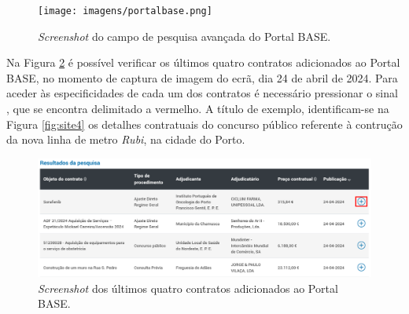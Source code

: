 \clearpage

\begin{figure}[H]
	\centering
	\texttt{[image: imagens/portalbase.png]}
	\caption{\textit{Screenshot} do campo de pesquisa avançada do Portal BASE.}
	\label{fig:site2}
\end{figure}

Na Figura \ref{fig:site3} é possível verificar os últimos quatro contratos adicionados ao Portal BASE, no momento de captura de imagem do ecrã, dia 24 de abril de 2024. Para aceder às especificidades de cada um dos contratos é necessário pressionar o sinal , que se encontra delimitado a vermelho. A título de exemplo, identificam-se na Figura \ref{fig:site4} os detalhes contratuais do concurso público referente à contrução da nova linha de metro \textit{Rubi}, na cidade do Porto.

\begin{figure}[H]
	\centering
	\includegraphics[width=\textwidth]{imagens/portalbase_pesquisa.png}
	\caption{\textit{Screenshot} dos últimos quatro contratos adicionados ao Portal BASE.}
	\label{fig:site3}
\end{figure}

